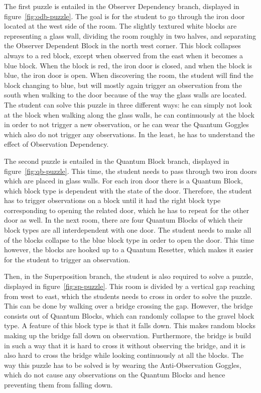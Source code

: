 \documentclass[11pt,twoside]{report} %
\begin{document}
The first puzzle is entailed in the Observer Dependency branch, displayed in figure~\ref{fig:odb-puzzle}. The goal is for the student to go through the iron door located at the west side of the room. The slightly textured white blocks are representing a glass wall, dividing the room roughly in two halves, and separating the Observer Dependent Block in the north west corner. This block collapses always to a red block, except when observed from the east when it becomes a blue block. When the block is red, the iron door is closed, and when the block is blue, the iron door is open. When discovering the room, the student will find the block changing to blue, but will mostly again trigger an observation from the south when walking to the door because of the way the glass walls are located. The student can solve this puzzle in three different ways: he can simply not look at the block when walking along the glass walls, he can continuously at the block in order to not trigger a new observation, or he can wear the Quantum Goggles which also do not trigger any observations. In the least, he has to understand the effect of Observation Dependency.

The second puzzle is entailed in the Quantum Block branch, displayed in figure~\ref{fig:qb-puzzle}. This time, the student needs to pass through two iron doors which are placed in glass walls. For each iron door there is a Quantum Block, which block type is dependent with the state of the door. Therefore, the student has to trigger observations on a block until it had the right block type corresponding to opening the related door, which he has to repeat for the other door as well. In the next room, there are four Quantum Blocks of which their block types are all interdependent with one door. The student needs to make all of the blocks collapse to the blue block type in order to open the door. This time however, the blocks are hooked up to a Quantum Resetter, which makes it easier for the student to trigger an observation.

Then, in the Superposition branch, the student is also required to solve a puzzle, displayed in figure~\ref{fig:sp-puzzle}. This room is divided by a vertical gap reaching from west to east, which the students needs to cross in order to solve the puzzle. This can be done by walking over a bridge crossing the gap. However, the bridge consists out of Quantum Blocks, which can randomly collapse to the gravel block type. A feature of this block type is that it falls down. This makes random blocks making up the bridge fall down on observation. Furthermore, the bridge is build in such a way that it is hard to cross it without observing the bridge, and it is also hard to cross the bridge while looking continuously at all the blocks. The way this puzzle has to be solved is by wearing the Anti-Observation Goggles, which do not cause any observations on the Quantum Blocks and hence preventing them from falling down.
\end{document}
